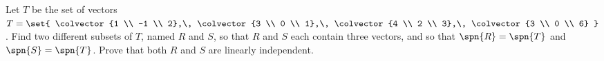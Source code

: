 Let $T$ be the set of vectors
$T=\set{
\colvector{1 \\ -1 \\ 2},\,
\colvector{3 \\ 0 \\ 1},\,
\colvector{4 \\ 2 \\ 3},\,
\colvector{3 \\ 0 \\ 6}
}$.
Find two different subsets of $T$, named $R$ and $S$, so that $R$ and $S$ each contain three vectors, and so that $\spn{R}=\spn{T}$ and $\spn{S}=\spn{T}$.  Prove that both $R$ and $S$ are linearly independent.